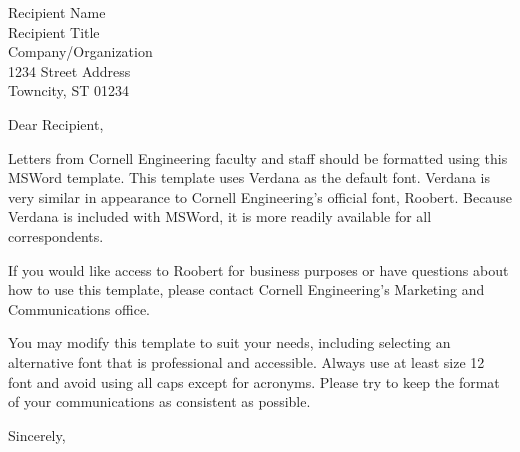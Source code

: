 \documentclass[12pt]{letter}
\begin{document}
\begin{letter}{
Recipient Name\\
Recipient Title\\
Company/Organization\\
1234 Street Address\\
Towncity, ST 01234
}


\opening{Dear Recipient,}

Letters from Cornell Engineering faculty and staff should be formatted using this MSWord template. This template uses Verdana as the default font. Verdana is very similar in appearance to Cornell Engineering’s official font, Roobert. Because Verdana is included with MSWord, it is more readily available for all correspondents. 

If you would like access to Roobert for business purposes or have questions about how to use this template, please contact Cornell Engineering’s Marketing and Communications office.

\newpage

You may modify this template to suit your needs, including selecting an alternative font that is professional and accessible. Always use at least size 12 font and avoid using all caps except for acronyms. Please try to keep the format of your communications as consistent as possible.


\closing{Sincerely,}


\end{letter}
\end{document}

